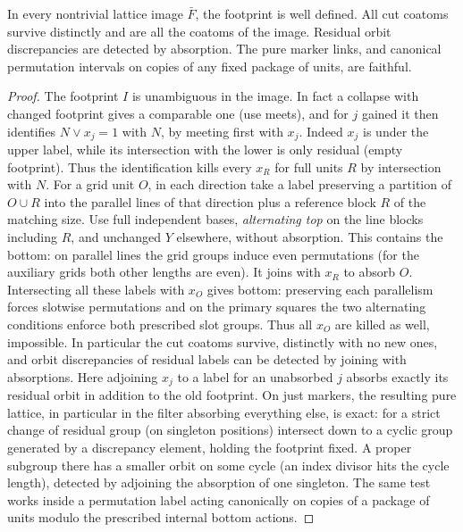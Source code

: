 \begin{lemma}\label{t:weighted-footprint}
In every nontrivial lattice image \(\bar F\), the footprint is well defined.
All cut coatoms survive distinctly and are all the coatoms of the image.
Residual orbit discrepancies are detected by absorption.  The pure marker
links, and canonical permutation intervals on copies of any fixed package of
units, are faithful.
\end{lemma}
\begin{proof}
The footprint \(I\) is unambiguous in the image. In fact a collapse with changed footprint gives a
comparable one (use meets), and for \(j\) gained it then identifies \(N\vee x_j=1\) with \(N\), by
meeting first with \(x_j\). Indeed \(x_j\) is under the upper label, while its intersection with
the lower is only residual (empty footprint). Thus the identification kills every \(x_R\) for full
units \(R\) by intersection with \(N\). For a grid unit \(O\), in each direction take a label
preserving a partition of \(O\cup R\) into the parallel lines of that direction plus a reference
block \(R\) of the matching size. Use full independent bases, \emph{alternating top} on the line
blocks including \(R\), and unchanged \(Y\) elsewhere, without absorption. This contains the
bottom: on parallel lines the grid groups induce even permutations (for the auxiliary grids both
other lengths are even). It joins with \(x_R\) to absorb \(O\). Intersecting all these labels with
\(x_O\) gives bottom: preserving each parallelism forces slotwise permutations and on the primary
squares the two alternating conditions enforce both prescribed slot groups. Thus all \(x_O\) are
killed as well, impossible. In particular the cut coatoms survive, distinctly with no new ones,
and orbit discrepancies of residual labels can be detected by joining with absorptions. Here
adjoining \(x_j\) to a label for an unabsorbed \(j\) absorbs exactly its residual orbit in
addition to the old footprint. On just markers, the resulting pure lattice, in particular in the
filter absorbing everything else, is exact: for a strict change of residual group (on singleton
positions) intersect down to a cyclic group generated by a discrepancy element, holding the
footprint fixed. A proper subgroup there has a smaller orbit on some cycle (an index divisor hits
the cycle length), detected by adjoining the absorption of one singleton. The same test works
inside a permutation label acting canonically on copies of a package of units modulo the
prescribed internal bottom actions.
\end{proof}

